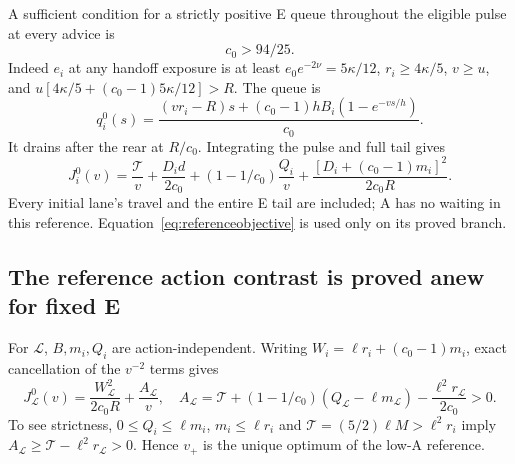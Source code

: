\documentclass[11pt,a4paper]{article}
\begin{document}
A sufficient condition for a strictly positive E queue throughout the
eligible pulse at every advice is
\begin{equation}
 c_0>94/25.
 \label{eq:sustained}
\end{equation}
Indeed $e_i$ at any handoff exposure is at least
$e_0e^{-2\nu}=5\kappa/12$, $r_i\geq4\kappa/5$, $v\geq u$, and
$u[4\kappa/5+(c_0-1)5\kappa/12]>R$. The queue is
\begin{equation}
 q_i^0(s)=\frac{(vr_i-R)s+(c_0-1)hB_i(1-e^{-vs/h})}{c_0}.
 \label{eq:referencequeue}
\end{equation}
It drains after the rear at $R/c_0$. Integrating the pulse and full tail gives
\begin{equation}
 J_i^0(v)=\frac{\mathcal T}{v}+\frac{D_id}{2c_0}
       +(1-1/c_0)\frac{Q_i}{v}
       +\frac{[D_i+(c_0-1)m_i]^2}{2c_0R}.
 \label{eq:referenceobjective}
\end{equation}
Every initial lane's travel and the entire E tail are included; A has no
waiting in this reference. Equation~\eqref{eq:referenceobjective} is used
only on its proved branch.

\subsection{The reference action contrast is proved anew for fixed E}
For $\mathcal L$, $B,m_i,Q_i$ are action-independent. Writing
$W_i=\ell r_i+(c_0-1)m_i$, exact cancellation of the $v^{-2}$ terms gives
\begin{equation}
 J_{\mathcal L}^0(v)=\frac{W_{\mathcal L}^2}{2c_0R}
        +\frac{A_{\mathcal L}}v,\quad
 A_{\mathcal L}=\mathcal T+(1-1/c_0)(Q_{\mathcal L}-\ell m_{\mathcal L})
                      -\frac{\ell^2r_{\mathcal L}}{2c_0}>0.
 \label{eq:lowmonotone}
\end{equation}
To see strictness, $0\leq Q_i\leq\ell m_i$,
$m_i\leq\ell r_i$ and $\mathcal T=(5/2)\ell M>\ell^2r_i$ imply
$A_{\mathcal L}\geq \mathcal T-\ell^2r_{\mathcal L}>0$.
Hence $v_+$ is the unique optimum of the low-A reference.
\end{document}
